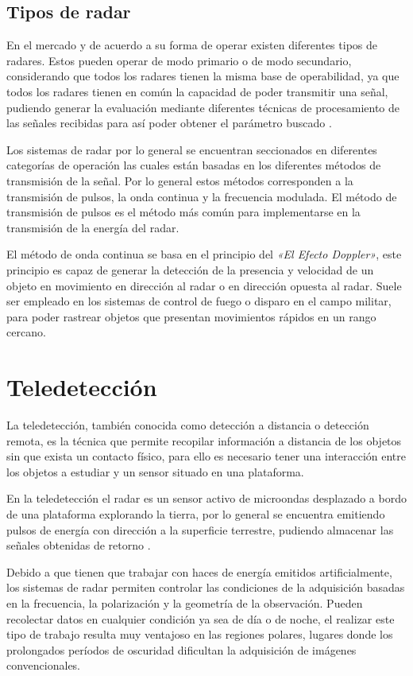 \subsection{Tipos de radar}	

En el mercado y de acuerdo a su forma de operar existen diferentes tipos de radares. Estos pueden operar de modo primario o de modo secundario, considerando que todos los radares tienen la misma base de operabilidad, ya que todos los radares tienen en común la capacidad de poder transmitir una señal, pudiendo generar la evaluación mediante diferentes técnicas de procesamiento de las señales recibidas para así poder obtener el parámetro buscado \cite{AcostaOsorio2014Mar}. 

Los sistemas de radar por lo general se encuentran seccionados en diferentes categorías de operación las cuales están basadas en los diferentes métodos de transmisión de la señal. Por lo general estos métodos corresponden a la transmisión de pulsos, la onda continua y la frecuencia modulada. El método de transmisión de pulsos es el método más común para implementarse en la transmisión de la energía del radar. 

El método de onda continua se basa en el principio del \textit{«El Efecto Doppler»}, este principio es capaz de generar la detección de la presencia y velocidad de un objeto en movimiento en dirección al radar o en dirección opuesta al radar. Suele ser empleado en los sistemas de control de fuego o disparo en el campo militar, para poder rastrear objetos que presentan movimientos rápidos en un rango cercano.


\section{Teledetección}

La teledetección, también conocida como detección a distancia o detección remota, es la técnica que permite recopilar información a distancia de los objetos sin que exista un contacto físico, para ello es necesario tener una interacción entre los objetos a estudiar y un sensor situado en una plataforma.

En la teledetección el radar es un sensor activo de microondas desplazado a bordo de una plataforma explorando la tierra, por lo general se encuentra emitiendo pulsos de energía con dirección a la superficie terrestre, pudiendo almacenar las señales obtenidas de retorno \cite{Marchionni2014}. 

Debido a que tienen que trabajar con haces de energía emitidos artificialmente, los sistemas de radar permiten controlar las condiciones de la adquisición basadas en la frecuencia, la polarización y la geometría de la observación. Pueden recolectar datos en cualquier condición ya sea de día o de noche, el realizar este tipo de trabajo resulta muy ventajoso en las regiones polares, lugares donde los prolongados períodos de oscuridad dificultan la adquisición de imágenes convencionales. 

